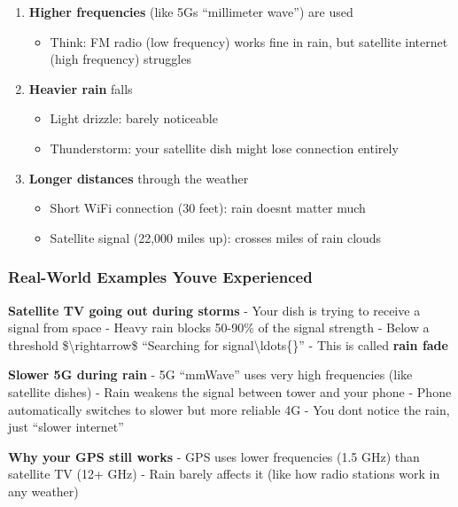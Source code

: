 \begin{enumerate}
\def\labelenumi{\arabic{enumi}.}
\tightlist
\item
  \textbf{Higher frequencies} (like 5G\textquotesingle s ``millimeter
  wave'') are used

  \begin{itemize}
  \tightlist
  \item
    Think: FM radio (low frequency) works fine in rain, but satellite
    internet (high frequency) struggles
  \end{itemize}
\item
  \textbf{Heavier rain} falls

  \begin{itemize}
  \tightlist
  \item
    Light drizzle: barely noticeable
  \item
    Thunderstorm: your satellite dish might lose connection entirely
  \end{itemize}
\item
  \textbf{Longer distances} through the weather

  \begin{itemize}
  \tightlist
  \item
    Short WiFi connection (30 feet): rain doesn\textquotesingle t matter
    much
  \item
    Satellite signal (22,000 miles up): crosses miles of rain clouds
  \end{itemize}
\end{enumerate}

\subsubsection{Real-World Examples You\textquotesingle ve
Experienced}\label{real-world-examples-youve-experienced}

\textbf{ Satellite TV going out during storms} - Your dish is trying to
receive a signal from space - Heavy rain blocks 50-90\% of the signal
strength - Below a threshold \$\textbackslash rightarrow\$ ``Searching
for signal\textbackslash ldots\{\}'' - This is called \textbf{rain fade}

\textbf{ Slower 5G during rain} - 5G ``mmWave'' uses very high
frequencies (like satellite dishes) - Rain weakens the signal between
tower and your phone - Phone automatically switches to slower but more
reliable 4G - You don\textquotesingle t notice the rain, just ``slower
internet''

\textbf{ Why your GPS still works} - GPS uses lower frequencies (1.5
GHz) than satellite TV (12+ GHz) - Rain barely affects it (like how
radio stations work in any weather)

